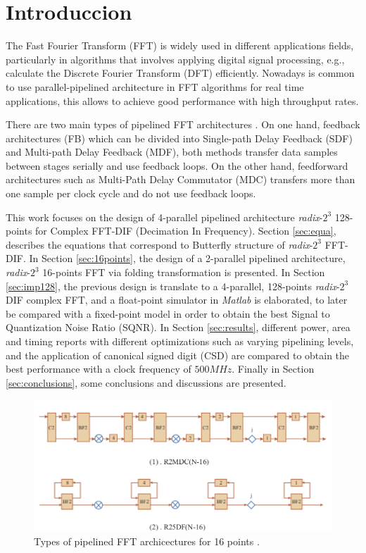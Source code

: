 \documentclass[journal,comsoc]{IEEEtran}
\begin{document}
\section{Introduccion}

The Fast Fourier Transform (FFT) is widely used in different applications fields, particularly in algorithms that involves applying digital signal processing, e.g., calculate the Discrete Fourier Transform (DFT) efficiently. Nowadays is common to use parallel-pipelined architecture in FFT algorithms for real time applications, this allows to achieve good performance with high throughput rates.

There are two main types of pipelined FFT architectures  \cite{shousheng_he_designing_1998}. On one hand, feedback architectures (FB) which can be divided into Single-path Delay Feedback (SDF) and Multi-path Delay Feedback (MDF), both methods transfer data samples between stages serially and use feedback loops. On the other hand, feedforward architectures such as Multi-Path Delay Commutator (MDC) transfers more than one sample per clock cycle and do not use feedback loops.

This work focuses on the design of 4-parallel pipelined architecture \textit{radix}-$2^3$ 128-points for Complex FFT-DIF (Decimation In Frequency). Section \ref{sec:equa}, describes the equations that correspond to Butterfly structure of \textit{radix}-$2^3$ FFT-DIF. In Section \ref{sec:16points}, the design of a 2-parallel pipelined architecture, \textit{radix}-$2^3$ 16-points FFT via folding transformation is presented. In Section \ref{sec:imp128}, the previous design is translate to a 4-parallel, 128-points \textit{radix}-$2^3$ DIF complex FFT, and a float-point simulator in \textit{Matlab} is elaborated, to later be compared with a fixed-point model in order to obtain the best Signal to Quantization Noise Ratio (SQNR).
In Section \ref{sec:results}, different power, area and timing reports with different optimizations such as varying pipelining levels, and the application of canonical signed digit (CSD) are compared to obtain the best performance with a clock frequency of $500MHz$. Finally in Section \ref{sec:conclusions}, some conclusions and discussions are presented.  


\begin{figure} 
	\centering
	\includegraphics[width=0.9\linewidth]{Diagramas/types_FFT.png}
	\caption{Types of pipelined FFT archicectures for 16 points \cite{type_FFT_MIT}.}
	\label{fig:types_fft}
\end{figure}
\end{document}
